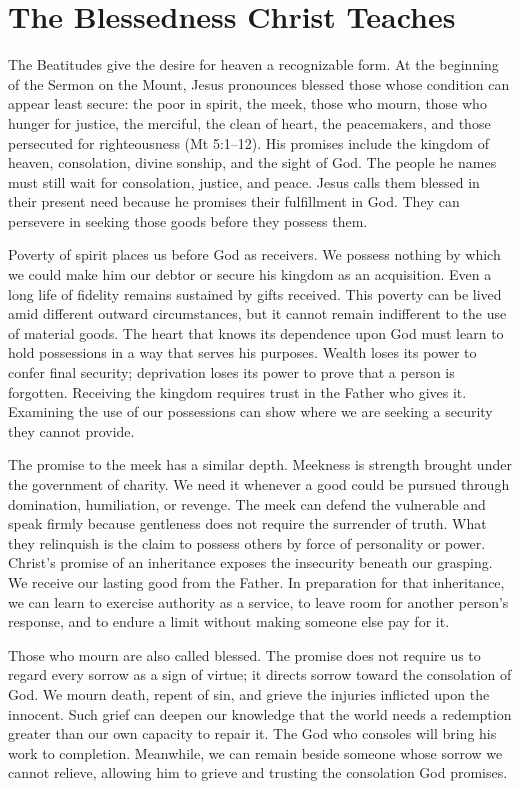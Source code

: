 \section{The Blessedness Christ Teaches}

The Beatitudes give the desire for heaven a recognizable form. At the beginning of the Sermon on the Mount, Jesus pronounces blessed those whose condition can appear least secure: the poor in spirit, the meek, those who mourn, those who hunger for justice, the merciful, the clean of heart, the peacemakers, and those persecuted for righteousness (Mt 5:1--12). His promises include the kingdom of heaven, consolation, divine sonship, and the sight of God. The people he names must still wait for consolation, justice, and peace. Jesus calls them blessed in their present need because he promises their fulfillment in God. They can persevere in seeking those goods before they possess them.

Poverty of spirit places us before God as receivers. We possess nothing by which we could make him our debtor or secure his kingdom as an acquisition. Even a long life of fidelity remains sustained by gifts received. This poverty can be lived amid different outward circumstances, but it cannot remain indifferent to the use of material goods. The heart that knows its dependence upon God must learn to hold possessions in a way that serves his purposes. Wealth loses its power to confer final security; deprivation loses its power to prove that a person is forgotten. Receiving the kingdom requires trust in the Father who gives it. Examining the use of our possessions can show where we are seeking a security they cannot provide.

The promise to the meek has a similar depth. Meekness is strength brought under the government of charity. We need it whenever a good could be pursued through domination, humiliation, or revenge. The meek can defend the vulnerable and speak firmly because gentleness does not require the surrender of truth. What they relinquish is the claim to possess others by force of personality or power. Christ's promise of an inheritance exposes the insecurity beneath our grasping. We receive our lasting good from the Father. In preparation for that inheritance, we can learn to exercise authority as a service, to leave room for another person's response, and to endure a limit without making someone else pay for it.

Those who mourn are also called blessed. The promise does not require us to regard every sorrow as a sign of virtue; it directs sorrow toward the consolation of God. We mourn death, repent of sin, and grieve the injuries inflicted upon the innocent. Such grief can deepen our knowledge that the world needs a redemption greater than our own capacity to repair it. The God who consoles will bring his work to completion. Meanwhile, we can remain beside someone whose sorrow we cannot relieve, allowing him to grieve and trusting the consolation God promises.

